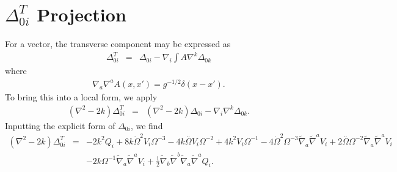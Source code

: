 \documentclass[10pt,letterpaper]{article}
\numberwithin{equation}{section}
\begin{document}
\section{$\Delta^{T}_{0i}$ Projection}
For a vector, the transverse component may be expressed as
\begin{eqnarray}
\Delta_{0i}^T &=& \Delta_{0i}- \nabla_i \int A \nabla^k \Delta_{0k}
\end{eqnarray}
where 
\begin{eqnarray}
\nabla_a\nabla^a A(x,x') = g^{-1/2}\delta(x-x').
\end{eqnarray}
To bring this into a local form, we apply 
\begin{eqnarray}
(\nabla^2-2k)\Delta_{0i}^T &=& (\nabla^2-2k)\Delta_{0i} - \nabla_i \nabla^k \Delta_{0k}.
\end{eqnarray}
Inputting the explicit form of $\Delta_{0i}$, we find
\begin{eqnarray}
(\nabla^2-2k)\Delta_{0i}^T &=& -2 k^2 Q_{i} + 8 k \dot{\Omega}^2 V_{i} \Omega^{-3} - 4 k \overset{..}{\Omega} V_{i} \Omega^{-2} + 4 k^2 V_{i} \Omega^{-1} - 4 \dot{\Omega}^2 \Omega^{-3} \tilde{\nabla}_{a}\tilde{\nabla}^{a}V_{i} + 2 \overset{..}{\Omega} \Omega^{-2} \tilde{\nabla}_{a}\tilde{\nabla}^{a}V_{i} \nonumber \\ 
&& - 2 k \Omega^{-1} \tilde{\nabla}_{a}\tilde{\nabla}^{a}V_{i} + \tfrac{1}{2} \tilde{\nabla}_{b}\tilde{\nabla}^{b}\tilde{\nabla}_{a}\tilde{\nabla}^{a}Q_{i}.
\end{eqnarray}
\end{document}
